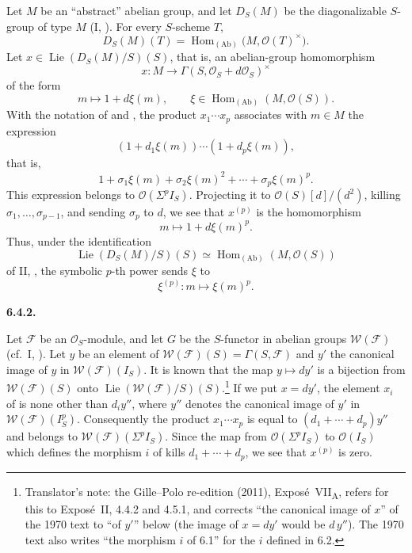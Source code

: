 Let \(M\) be an ``abstract'' abelian group, and let \(D_S(M)\)
be the diagonalizable \(S\)-group of type \(M\) (I, ). For
every \(S\)-scheme \(T\),
\[
  D_S(M)(T)
  =
  \operatorname{Hom}_{(\mathrm{Ab})}
  \bigl(M,\mathcal O(T)^\times\bigr).
\]
Let \(x\in\operatorname{Lie}(D_S(M)/S)(S)\), that is, an
abelian-group homomorphism
\[
  x:M\longrightarrow
  \Gamma(S,\mathcal O_S+d\mathcal O_S)^\times
\]
of the form
\[
  m\longmapsto1+d\xi(m),
  \qquad
  \xi\in
  \operatorname{Hom}_{(\mathrm{Ab})}(M,\mathcal O(S)).
\]
With the notation of  and , the product
\(x_1\cdots x_p\) associates with \(m\in M\) the expression
\[
  (1+d_1\xi(m))\cdots(1+d_p\xi(m)),
\]
that is,
\[
  1+\sigma_1\xi(m)+\sigma_2\xi(m)^2+\cdots+
  \sigma_p\xi(m)^p.
\]
This expression belongs to \(\mathcal O(\Sigma^p I_S)\).
Projecting it to \(\mathcal O(S)[d]/(d^2)\), killing
\(\sigma_1,\ldots,\sigma_{p-1}\), and sending \(\sigma_p\) to
\(d\), we see that \(x^{(p)}\) is the homomorphism
\[
  m\longmapsto1+d\xi(m)^p.
\]
Thus, under the identification
\[
  \operatorname{Lie}(D_S(M)/S)(S)
  \simeq
  \operatorname{Hom}_{(\mathrm{Ab})}(M,\mathcal O(S))
\]
of II, , the symbolic \(p\)-th power sends \(\xi\) to
\[
  \xi^{(p)}:m\longmapsto\xi(m)^p.
\]

\medskip
\noindent\textbf{6.4.2.}
\label{sga3:VIIA:6.4.2}

Let \(\mathcal F\) be an \(\mathcal O_S\)-module, and let \(G\) be the
\(S\)-functor in abelian groups \(\mathcal W(\mathcal F)\) (cf.\ I,
). Let \(y\) be an element of
\(\mathcal W(\mathcal F)(S)=\Gamma(S,\mathcal F)\) and \(y'\) the
canonical image of \(y\) in \(\mathcal W(\mathcal F)(I_S)\). It is known
that the map \(y\mapsto dy'\) is a bijection from
\(\mathcal W(\mathcal F)(S)\) onto
\(\operatorname{Lie}(\mathcal W(\mathcal F)/S)(S)\).\footnote{Translator's
note: the Gille--Polo re-edition (2011), Expos\'e~VII\textsubscript{A},
refers for this to Expos\'e~II, 4.4.2 and 4.5.1, and corrects ``the
canonical image of \(x\)'' of the 1970 text to ``of \(y'\)'' below (the
image of \(x=dy'\) would be \(d\,y''\)). The 1970 text also writes ``the
morphism \(i\) of 6.1'' for the \(i\) defined in 6.2.} If we put
\(x=dy'\), the element \(x_i\) of  is none other than \(d_iy''\),
where \(y''\) denotes the canonical image of \(y'\) in
\(\mathcal W(\mathcal F)(I_S^p)\). Consequently the product
\(x_1\cdots x_p\) is equal to \((d_1+\cdots+d_p)y''\) and belongs to
\(\mathcal W(\mathcal F)(\Sigma^p I_S)\). Since the map from
\(\mathcal O(\Sigma^p I_S)\) to \(\mathcal O(I_S)\) which defines the
morphism \(i\) of  kills \(d_1+\cdots+d_p\), we see that \(x^{(p)}\)
is zero.

